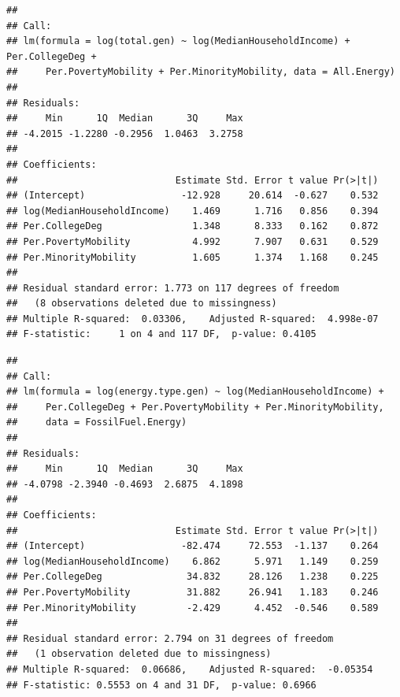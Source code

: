 \documentclass[
  12pt,
]{article}
\begin{document}
\begin{verbatim}
## 
## Call:
## lm(formula = log(total.gen) ~ log(MedianHouseholdIncome) + Per.CollegeDeg + 
##     Per.PovertyMobility + Per.MinorityMobility, data = All.Energy)
## 
## Residuals:
##     Min      1Q  Median      3Q     Max 
## -4.2015 -1.2280 -0.2956  1.0463  3.2758 
## 
## Coefficients:
##                            Estimate Std. Error t value Pr(>|t|)
## (Intercept)                 -12.928     20.614  -0.627    0.532
## log(MedianHouseholdIncome)    1.469      1.716   0.856    0.394
## Per.CollegeDeg                1.348      8.333   0.162    0.872
## Per.PovertyMobility           4.992      7.907   0.631    0.529
## Per.MinorityMobility          1.605      1.374   1.168    0.245
## 
## Residual standard error: 1.773 on 117 degrees of freedom
##   (8 observations deleted due to missingness)
## Multiple R-squared:  0.03306,    Adjusted R-squared:  4.998e-07 
## F-statistic:     1 on 4 and 117 DF,  p-value: 0.4105
\end{verbatim}

\begin{verbatim}
## 
## Call:
## lm(formula = log(energy.type.gen) ~ log(MedianHouseholdIncome) + 
##     Per.CollegeDeg + Per.PovertyMobility + Per.MinorityMobility, 
##     data = FossilFuel.Energy)
## 
## Residuals:
##     Min      1Q  Median      3Q     Max 
## -4.0798 -2.3940 -0.4693  2.6875  4.1898 
## 
## Coefficients:
##                            Estimate Std. Error t value Pr(>|t|)
## (Intercept)                 -82.474     72.553  -1.137    0.264
## log(MedianHouseholdIncome)    6.862      5.971   1.149    0.259
## Per.CollegeDeg               34.832     28.126   1.238    0.225
## Per.PovertyMobility          31.882     26.941   1.183    0.246
## Per.MinorityMobility         -2.429      4.452  -0.546    0.589
## 
## Residual standard error: 2.794 on 31 degrees of freedom
##   (1 observation deleted due to missingness)
## Multiple R-squared:  0.06686,    Adjusted R-squared:  -0.05354 
## F-statistic: 0.5553 on 4 and 31 DF,  p-value: 0.6966
\end{verbatim}
\end{document}
